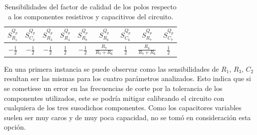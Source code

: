 \begin{table}[H]
\centering
{}
\caption{Sensibilidades del factor de calidad de los ceros respecto a los componentes resistivos y capacitivos del circuito.}
\label{tab:sens_Qz}
\end{table}


\begin{table}[H]
\centering
\begin{tabular}{@{}ccccccccc@{}}
\toprule
$S^{Q_p}_{R_1}$ & $S^{Q_p}_{C_2}$ & $S^{Q_p}_{R_3}$ & $S^{Q_p}_{R_4}$ & $S^{Q_p}_{R_8}$ & $S^{Q_p}_{R_6}$ & $S^{Q_p}_{C_6}$ & $S^{Q_p}_{R_7}$ & $S^{Q_p}_{C_7}$  \\ \midrule
$-\frac{1}{2}$ & $-\frac{1}{2}$ & $-\frac{1}{2}$ & $\frac{1}{2}$ & $-\frac{1}{2}$ & $\frac{R_7}{R_7 + R_6}$ & $\frac{1}{2}$ & $\frac{R_6}{R_7+R_6}$ & $\frac{1}{2}$ \\ \bottomrule
\end{tabular}
\caption{Sensibilidades del factor de calidad de los polos respecto a los componentes resistivos y capacitivos del circuito.}
\label{tab:sens_Qp}
\end{table}

En una primera instancia se puede observar como las sensibilidades de $R_1$, $R_3$, $C_2$ resultan ser las mismas para los cuatro parámetros analizados. Esto indica que si se cometiese un error en las frecuencias de corte por la tolerancia de los componentes utilizados, este se podría mitigar calibrando el circuito con cualquiera de los tres susodichos componentes. Como los capacitores variables suelen ser muy caros y de muy poca capacidad, no se tomó en consideración esta opción.

